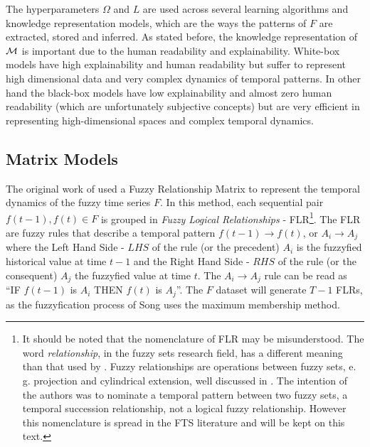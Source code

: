 The hyperparameters $\Omega$ and $L$ are used across several learning algorithms and knowledge representation models, which are the ways the patterns of $F$ are extracted, stored and inferred. As stated before, the knowledge representation of $\mathcal{M}$ is important due to the human readability and explainability. White-box models have high explainability and human readability but suffer to represent high dimensional data and very complex dynamics of temporal patterns. In other hand the black-box models have low explainability and almost zero human readability (which are unfortunately subjective concepts) but are very efficient in representing high-dimensional spaces and complex temporal dynamics.


%
\subsection{Matrix Models}
\label{sec:fts_matrix}

The original work of \cite{song1993fuzzy} used a Fuzzy Relationship Matrix to represent the temporal dynamics of the fuzzy time series $F$. In this method, each sequential pair $f(t-1),f(t) \in F$ is grouped in \textit{Fuzzy Logical Relationships} - FLR\footnote{It should be noted that the nomenclature of FLR may be misunderstood. The word \textit{relationship}, in the fuzzy sets research field, has a different meaning than that used by \citeauthor{song1993fuzzy}. Fuzzy relationships are operations between fuzzy sets, e. g. projection and cylindrical extension, well discussed in \cite{Klir1995}. The intention of the authors was to nominate a temporal pattern between two fuzzy sets, a temporal succession relationship, not a logical fuzzy relationship.  However this nomenclature is spread in the FTS literature and will be kept on this text.}. The FLR are fuzzy rules that describe a temporal pattern $f(t-1) \rightarrow f(t)$, or $A_i \rightarrow A_j$ where the Left Hand Side - $LHS$ of the rule (or the precedent)  $A_i$ is the fuzzyfied historical value at time $t-1$ and the Right Hand Side - $RHS$ of the rule (or the consequent) $A_j$ the fuzzyfied value at time $t$. The $A_i \rightarrow A_j$ rule can be read as ``IF $f(t-1)$ is $A_i$ THEN $f(t)$ is $A_j$''. The $F$ dataset will generate $T-1$ FLRs, as the fuzzyfication process of Song uses the maximum membership method.

